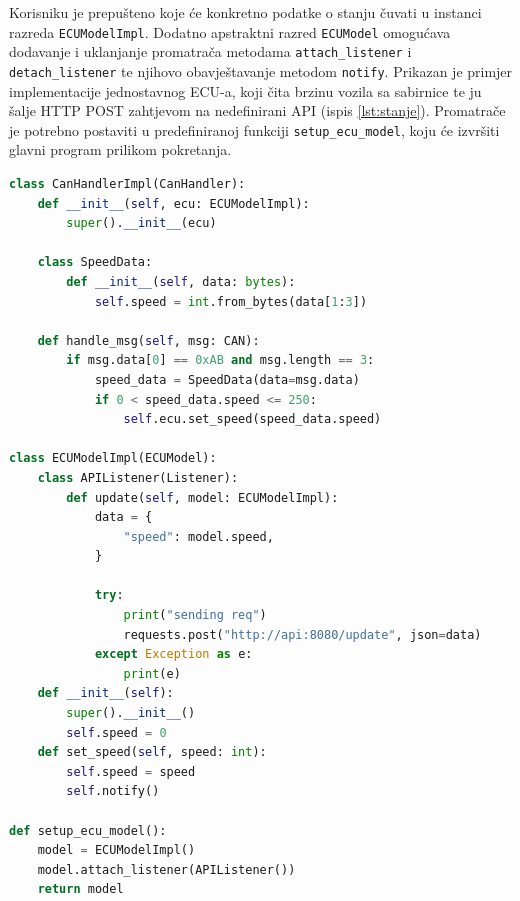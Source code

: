 \documentclass[times, utf8, diplomski, numeric]{fer}
\begin{document}
Korisniku je prepušteno koje će konkretno podatke o stanju čuvati u instanci razreda \texttt{ECUModelImpl}. Dodatno apstraktni razred \texttt{ECUModel} omogućava dodavanje i uklanjanje promatrača metodama \texttt{attach\_listener} i \texttt{detach\_listener} te njihovo obavještavanje metodom \texttt{notify}. Prikazan je primjer implementacije jednostavnog ECU-a, koji čita brzinu vozila sa sabirnice te ju šalje HTTP POST zahtjevom na nedefinirani API (ispis \ref{lst:stanje}). Promatrače je potrebno postaviti u predefiniranoj funkciji \texttt{setup\_ecu\_model}, koju će izvršiti glavni program prilikom pokretanja.

\newpage
\begin{lstlisting}[language=Python, label={lst:stanje},caption={Primjer implementacije \texttt{ECUModelImpl}}]
class CanHandlerImpl(CanHandler):
    def __init__(self, ecu: ECUModelImpl):
        super().__init__(ecu)

    class SpeedData:
        def __init__(self, data: bytes):
            self.speed = int.from_bytes(data[1:3])

    def handle_msg(self, msg: CAN):
        if msg.data[0] == 0xAB and msg.length == 3:
            speed_data = SpeedData(data=msg.data)
            if 0 < speed_data.speed <= 250:
                self.ecu.set_speed(speed_data.speed)

class ECUModelImpl(ECUModel):        
    class APIListener(Listener):
        def update(self, model: ECUModelImpl):
            data = {
                "speed": model.speed,
            }
    
            try:
                print("sending req")
                requests.post("http://api:8080/update", json=data)
            except Exception as e:
                print(e)
    def __init__(self):
        super().__init__()
        self.speed = 0
    def set_speed(self, speed: int):
        self.speed = speed
        self.notify()

def setup_ecu_model():
    model = ECUModelImpl()
    model.attach_listener(APIListener())
    return model
\end{lstlisting}
\end{document}
